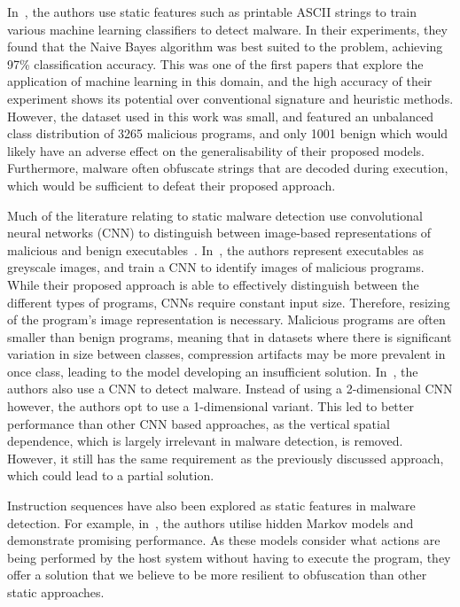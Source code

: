 \documentclass[main.tex]{subfiles}
\begin{document}
In~\cite{schultzDataMiningMethods2001a}, the authors use static features such as printable ASCII strings to train various machine learning classifiers to detect malware. In their experiments, they found that the Naive Bayes algorithm was best suited to the problem, achieving 97\% classification accuracy. This was one of the first papers that explore the application of machine learning in this domain, and the high accuracy of their experiment shows its potential over conventional signature and heuristic methods. However, the dataset used in this work was small, and featured an unbalanced class distribution of 3265 malicious programs, and only 1001 benign which would likely have an adverse effect on the generalisability of their proposed models. Furthermore, malware often obfuscate strings that are decoded during execution, which would be sufficient to defeat their proposed approach. 

Much of the literature relating to static malware detection use convolutional neural networks (CNN) to distinguish between image-based representations of malicious and benign executables~\citep{niMalwareIdentificationUsing2018,jainConvolutionalNeuralNetworks2020,habibiPerformanceEvaluationCNN2023}. In~\cite{aslanNewMalwareClassification2021}, the authors represent executables as greyscale images, and train a CNN to identify images of malicious programs. While their proposed approach is able to effectively distinguish between the different types of programs, CNNs require constant input size. Therefore, resizing of the program's image representation is necessary. Malicious programs are often smaller than benign programs, meaning that in datasets where there is significant variation in size between classes, compression artifacts may be more prevalent in once class, leading to the model developing an insufficient solution. In~\cite{sharmaMalwareDetectionUsing2019}, the authors also use a CNN to detect malware. Instead of using a 2-dimensional CNN however, the authors opt to use a 1-dimensional variant. This led to better performance than other CNN based approaches, as the vertical spatial dependence, which is largely irrelevant in malware detection, is removed. However, it still has the same requirement as the previously discussed approach, which could lead to a partial solution. 

Instruction sequences have also been explored as static features in malware detection. For example, in~\citep{attaluriProfileHiddenMarkov2009,runwalOpcodeGraphSimilarity2012}, the authors utilise hidden Markov models and demonstrate promising performance. As these models consider what actions are being performed by the host system without having to execute the program, they offer a solution that we believe to be more resilient to obfuscation than other static approaches. 
\end{document}
